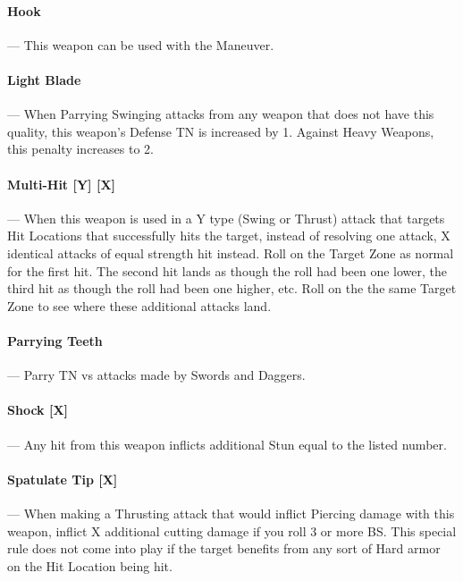 \documentclass[oneside,11pt,english]{book}
\begin{document}
\paragraph{\label{wepqual:Hook}Hook}---\quad
This weapon can be used with the  Maneuver.

\paragraph{\label{wepqual:Light Blade}Light Blade}---\quad
When Parrying Swinging attacks from any weapon that does not have this quality, this weapon’s Defense TN is increased by 1. Against Heavy Weapons, this penalty increases to 2.

\paragraph{\label{wepqual:Multi-Hit}Multi-Hit [Y] [X]}---\quad
When this weapon is used in a Y type (Swing or Thrust) attack that targets Hit Locations that successfully hits the target, instead of resolving one attack, X identical attacks of equal strength hit instead. Roll on the Target Zone as normal for the first hit. The second hit lands as though the roll had been one lower, the third hit as though the roll had been one higher, etc. Roll on the the same Target Zone to see where these additional attacks land.

\paragraph{\label{wepqual:Parrying Teeth}Parrying Teeth}--- Parry TN vs attacks made by Swords and Daggers.

\paragraph{\label{wepqual:Shock}Shock [X]}---\quad
Any hit from this weapon inflicts additional Stun equal to the listed number.

\paragraph{\label{wepqual:Spatulate Tip}Spatulate Tip [X]}---\quad
When making a Thrusting attack that would inflict Piercing damage with this weapon, inflict X additional cutting damage if you roll 3 or more BS. This special rule does not come into play if the target benefits from any sort of Hard armor on the Hit Location being hit.
\end{document}
